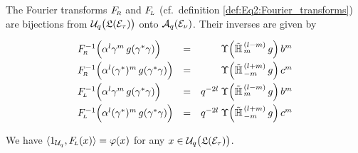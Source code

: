 \begin{prop_sec}  \label{prop:Eq2:Fourier:bijections}
The Fourier transforms\/ $F_{\!\scriptscriptstyle R}$ and\/ $F_{\!\scriptscriptstyle L}$
(cf.\ definition \ref{def:Eq2:Fourier_transforms}) are bijections from\/
$\Uq\!\left( \vertM \calL(\Hcore_\tau)\right)$ onto\/ ${\mathcal A}_q(\mathcal E_\nu)$.
Their inverses are given by
$$\begin{array}{lcr}
     \FRabb^{-1} \!\left(  \alpha^l \gamma^m \, g(\gamma^*\gamma) \vertL \right)
&=&
     \Upsilon \!\left(\Htil{m}{l-m}\,g \right) b^m   \vertXL
\\
     \FRabb^{-1} \!\left(  \alpha^l (\gamma^*)^m \,g(\gamma^*\gamma) \vertL \right)
&=&
     \Upsilon \!\left(\Htil{-m}{l+m}\,g \right) c^m  \vertXL
\\
     \FLabb^{-1} \!\left(  \alpha^l \gamma^m \,g(\gamma^*\gamma) \vertL \right)
&=&
     q^{-2l} \: \Upsilon \!\left(\Htil{m}{l-m}\,g \right) b^m  \vertXL
\\
     \FLabb^{-1} \!\left(  \alpha^l (\gamma^*)^m \,g(\gamma^*\gamma) \vertL \right)
&=&
     q^{-2l} \: \Upsilon \!\left(\Htil{-m}{l+m}\,g \right) c^m  \vertXL
\end{array} $$
\end{prop_sec}



\begin{lemma_sec} \label{lemma:Eq2:lambdaiszeta}
We have\/ $\langle 1_{{\mathcal U}_q},F_{\!\scriptscriptstyle L}(x) \rangle = \varphi(x)$
for any\/ $x\in \Uq\!\left(\calL(\Hcore_\tau)\vertM\right)$.
\end{lemma_sec}

